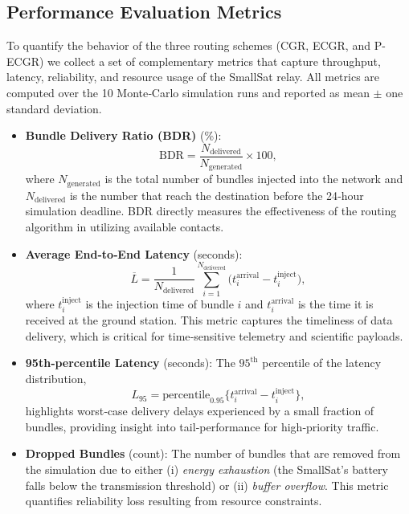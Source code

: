 \documentclass[journal,twocolumn]{IEEEtran}
\newcommand{\ecgr}{\textsf{ECGR}}
\newcommand{\cgr}{\textsf{CGR}}
\newcommand{\pecgr}{\textsf{P-ECGR}}
\begin{document}
\subsection{Performance Evaluation Metrics}
\label{sec:metrics}
To quantify the behavior of the three routing schemes (\cgr{}, \ecgr{}, and \pecgr{}) we collect a set of complementary metrics that capture throughput, latency, reliability, and resource usage of the SmallSat relay.  All metrics are computed over the 10 Monte‑Carlo simulation runs and reported as mean $\pm$ one standard deviation.
\begin{itemize}
  \item \textbf{Bundle Delivery Ratio (BDR)} (\%):
        \begin{equation}
          \text{BDR}
          = \frac{N_{\text{delivered}}}{N_{\text{generated}}}\times 100,
        \end{equation}
        where $N_{\text{generated}}$ is the total number of bundles injected into the network and $N_{\text{delivered}}$ is the number that reach the destination before the 24‑hour simulation deadline.  BDR directly measures the effectiveness of the routing algorithm in utilizing available contacts.
  \item \textbf{Average End‑to‑End Latency} (seconds):
        \begin{equation}
          \overline{L}
          = \frac{1}{N_{\text{delivered}}}
            \sum_{i=1}^{N_{\text{delivered}}}
            \bigl(t^{\text{arrival}}_{i} - t^{\text{inject}}_{i}\bigr),
        \end{equation}
        where $t^{\text{inject}}_{i}$ is the injection time of bundle $i$ and $t^{\text{arrival}}_{i}$ is the time it is received at the ground station.  This metric captures the timeliness of data delivery, which is critical for time‑sensitive telemetry and scientific payloads.
  \item \textbf{95th‑percentile Latency} (seconds):
        The $95^{\text{th}}$ percentile of the latency distribution,
        \[
          L_{95} = \text{percentile}_{0.95}\bigl\{t^{\text{arrival}}_{i} - t^{\text{inject}}_{i}\bigr\},
        \]
        highlights worst‑case delivery delays experienced by a small fraction of bundles, providing insight into tail‑performance for high‑priority traffic.
  \item \textbf{Dropped Bundles} (count):
        The number of bundles that are removed from the simulation due to either (i) \emph{energy exhaustion} (the SmallSat’s battery falls below the transmission threshold) or (ii) \emph{buffer overflow}.  This metric quantifies reliability loss resulting from resource constraints.

\end{itemize}
\end{document}

